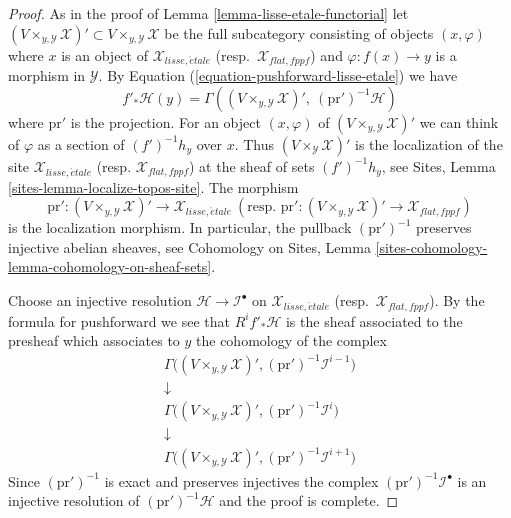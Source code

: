 \documentclass[10pt,a4paper]{amsart}
\theoremstyle{plain}
\theoremstyle{definition}
\theoremstyle{remark}
\numberwithin{equation}{subsection}
\def\etale{{\acute{e}tale}}
\begin{document}
\begin{proof}
As in the proof of Lemma \ref{lemma-lisse-etale-functorial}
let $(V \times_{y, \mathcal{Y}} \mathcal{X})' \subset
V \times_{y, \mathcal{Y}} \mathcal{X}$ be the full subcategory
consisting of objects $(x, \varphi)$ where $x$ is an object of
$\mathcal{X}_{lisse,\etale}$ (resp.\ $\mathcal{X}_{flat,fppf}$)
and $\varphi : f(x) \to y$ is a morphism in $\mathcal{Y}$.
By Equation (\ref{equation-pushforward-lisse-etale}) 
we have
$$
f'_*\mathcal{H}(y) =
\Gamma((V \times_{y, \mathcal{Y}} \mathcal{X})',
\ (\text{pr}')^{-1}\mathcal{H})
$$
where $\text{pr}'$ is the projection. For an object $(x, \varphi)$
of $(V \times_{y, \mathcal{Y}} \mathcal{X})'$
we can think of $\varphi$ as a section of $(f')^{-1}h_y$ over $x$.
Thus $(V \times_\mathcal{Y} \mathcal{X})'$ is the localization
of the site $\mathcal{X}_{lisse,\etale}$
(resp. $\mathcal{X}_{flat,fppf}$) at the sheaf of sets $(f')^{-1}h_y$, see
Sites, Lemma \ref{sites-lemma-localize-topos-site}. The morphism
$$
\text{pr}' : (V \times_{y, \mathcal{Y}} \mathcal{X})'
\to \mathcal{X}_{lisse,\etale}
\ (\text{resp. }
\text{pr}' : (V \times_{y, \mathcal{Y}} \mathcal{X})'
\to \mathcal{X}_{flat,fppf})
$$
is the localization morphism.
In particular, the pullback $(\text{pr}')^{-1}$ preserves
injective abelian sheaves, see
Cohomology on Sites, Lemma
\ref{sites-cohomology-lemma-cohomology-on-sheaf-sets}.

\medskip\noindent
Choose an injective resolution $\mathcal{H} \to \mathcal{I}^\bullet$
on $\mathcal{X}_{lisse,\etale}$ (resp.\ $\mathcal{X}_{flat,fppf}$).
By the formula for pushforward we see that $R^if'_*\mathcal{H}$ is the
sheaf associated to the presheaf which associates to $y$ the cohomology
of the complex
$$
\begin{matrix}
\Gamma\Big((V \times_{y, \mathcal{Y}} \mathcal{X})',
(\text{pr}')^{-1}\mathcal{I}^{i - 1}\Big) \\
\downarrow \\
\Gamma\Big((V \times_{y, \mathcal{Y}} \mathcal{X})',
(\text{pr}')^{-1}\mathcal{I}^i\Big) \\
\downarrow \\
\Gamma\Big((V \times_{y, \mathcal{Y}} \mathcal{X})',
(\text{pr}')^{-1}\mathcal{I}^{i + 1}\Big)
\end{matrix}
$$
Since $(\text{pr}')^{-1}$ is exact and preserves injectives the
complex $(\text{pr}')^{-1}\mathcal{I}^\bullet$ is an
injective resolution of $(\text{pr}')^{-1}\mathcal{H}$
and the proof is complete.
\end{proof}
\end{document}
